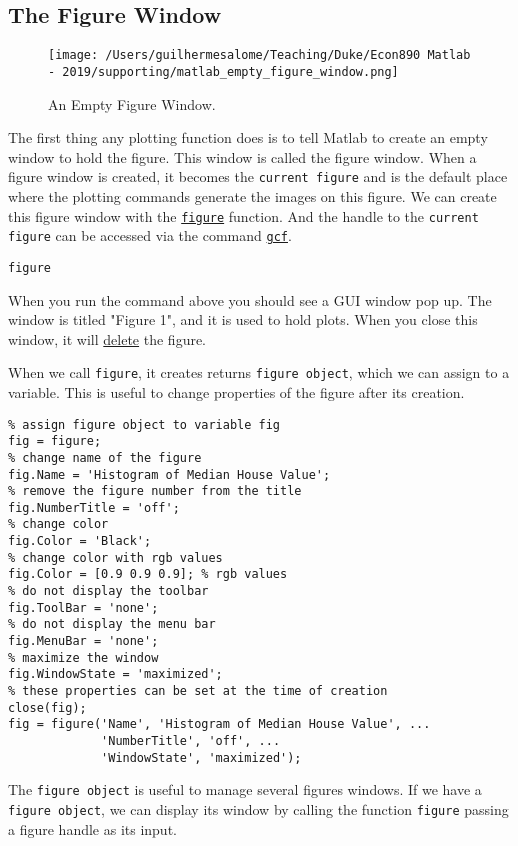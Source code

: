 \documentclass[12pt, a4paper]{article}
\begin{document}
\subsection{The Figure Window}
\label{sec:orge7396ab}
\begin{figure}[H]
\centering
\texttt{[image: /Users/guilhermesalome/Teaching/Duke/Econ890 Matlab - 2019/supporting/matlab\_empty\_figure\_window.png]}
\caption{\label{fig:orgc067647}
An Empty Figure Window.}
\end{figure}

The first thing any plotting function does is to tell Matlab to create an empty window to hold the figure.
This window is called the figure window.
When a figure window is created, it becomes the \texttt{current figure} and is the default place where the plotting commands generate the images on this figure.
We can create this figure window with the \href{https://www.mathworks.com/help/matlab/ref/figure.html}{\texttt{figure}} function.
And the handle to the \texttt{current figure} can be accessed via the command \href{https://www.mathworks.com/help/matlab/ref/gcf.html}{\texttt{gcf}}.
\lstset{language=matlab,label= ,caption= ,captionpos=b,firstnumber=1,numbers=left,style=Matlab-editor}
\begin{lstlisting}
figure
\end{lstlisting}
When you run the command above you should see a GUI window pop up.
The window is titled "Figure 1", and it is used to hold plots.
When you close this window, it will \uline{delete} the figure.

When we call \texttt{figure}, it creates returns \texttt{figure object}, which we can assign to a variable.
This is useful to change properties of the figure after its creation.
\lstset{language=matlab,label= ,caption= ,captionpos=b,firstnumber=1,numbers=left,style=Matlab-editor}
\begin{lstlisting}
% assign figure object to variable fig
fig = figure;
% change name of the figure
fig.Name = 'Histogram of Median House Value';
% remove the figure number from the title
fig.NumberTitle = 'off';
% change color
fig.Color = 'Black';
% change color with rgb values
fig.Color = [0.9 0.9 0.9]; % rgb values
% do not display the toolbar
fig.ToolBar = 'none';
% do not display the menu bar
fig.MenuBar = 'none';
% maximize the window
fig.WindowState = 'maximized';
% these properties can be set at the time of creation
close(fig);
fig = figure('Name', 'Histogram of Median House Value', ...
             'NumberTitle', 'off', ...
             'WindowState', 'maximized');
\end{lstlisting}
The \texttt{figure object} is useful to manage several figures windows.
If we have a \texttt{figure object}, we can display its window by calling the function \texttt{figure} passing a figure handle as its input.
\end{document}
